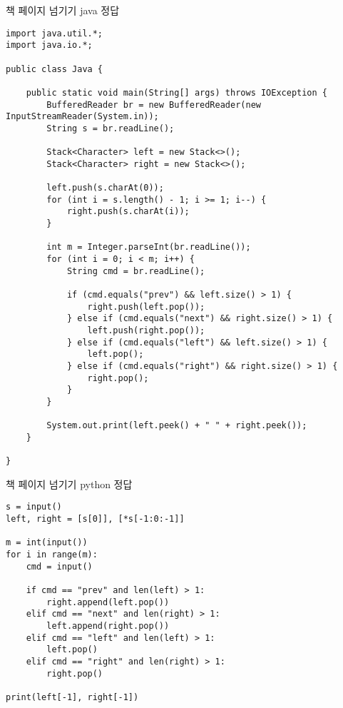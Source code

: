 \begin{frame}[fragile]{책 페이지 넘기기 java 정답}
\begin{verbatim}
import java.util.*;
import java.io.*;

public class Java {

    public static void main(String[] args) throws IOException {
        BufferedReader br = new BufferedReader(new InputStreamReader(System.in));
        String s = br.readLine();

        Stack<Character> left = new Stack<>();
        Stack<Character> right = new Stack<>();

        left.push(s.charAt(0));
        for (int i = s.length() - 1; i >= 1; i--) {
            right.push(s.charAt(i));
        }

        int m = Integer.parseInt(br.readLine());
        for (int i = 0; i < m; i++) {
            String cmd = br.readLine();

            if (cmd.equals("prev") && left.size() > 1) {
                right.push(left.pop());
            } else if (cmd.equals("next") && right.size() > 1) {
                left.push(right.pop());
            } else if (cmd.equals("left") && left.size() > 1) {
                left.pop();
            } else if (cmd.equals("right") && right.size() > 1) {
                right.pop();
            }
        }

        System.out.print(left.peek() + " " + right.peek());
    }

}

\end{verbatim}
\end{frame}


\begin{frame}[fragile]{책 페이지 넘기기 python 정답}
\begin{verbatim}
s = input()
left, right = [s[0]], [*s[-1:0:-1]]

m = int(input())
for i in range(m):
    cmd = input()

    if cmd == "prev" and len(left) > 1:
        right.append(left.pop())
    elif cmd == "next" and len(right) > 1:
        left.append(right.pop())
    elif cmd == "left" and len(left) > 1:
        left.pop()
    elif cmd == "right" and len(right) > 1:
        right.pop()

print(left[-1], right[-1])

\end{verbatim}
\end{frame}
